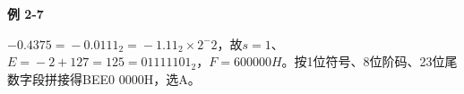 {\color{ink}\bfseries 例 2-7}\par\vspace{1bp}\(-0.4375=\allowbreak{}-0.0111_{2}=\allowbreak{}-1.11_{2}\times 2^-2\)，故\(s=\allowbreak{}1\)、\(E=\allowbreak{}-2+\allowbreak{}127=\allowbreak{}125=\allowbreak{}01111101_{2}\)，\(F=\allowbreak{}600000H\)。按1位符号、8位阶码、23位尾数字段拼接得BEE0 0000H，选A。
